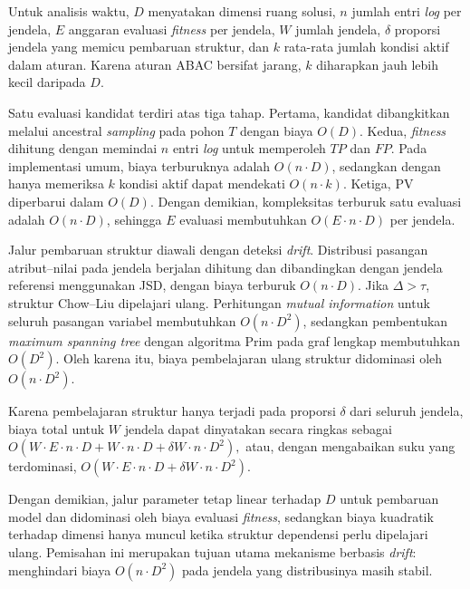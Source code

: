Untuk analisis waktu, $D$ menyatakan dimensi ruang solusi, $n$\label{first:symbolnn} jumlah entri \textit{log} per jendela, $E$ anggaran evaluasi \textit{fitness} per jendela, $W$ jumlah jendela, $\delta$\label{first:symbol-deltagede} proporsi jendela yang memicu pembaruan struktur, dan $k$ rata-rata jumlah kondisi aktif dalam aturan. 
Karena aturan ABAC bersifat jarang, $k$ diharapkan jauh lebih kecil daripada $D$.

Satu evaluasi kandidat terdiri atas tiga tahap. 
Pertama, kandidat dibangkitkan melalui ancestral \textit{sampling} pada pohon $T$ dengan biaya $O(D)$. 
Kedua, \textit{fitness} dihitung dengan memindai $n$ entri \textit{log} untuk memperoleh $TP$ dan $FP$. 
Pada implementasi umum, biaya terburuknya adalah $O(n \cdot D)$, sedangkan dengan hanya memeriksa $k$ kondisi aktif dapat mendekati $O(n \cdot k)$. 
Ketiga, PV diperbarui dalam $O(D)$. 
Dengan demikian, kompleksitas terburuk satu evaluasi adalah $O(n \cdot D)$, sehingga $E$ evaluasi membutuhkan
$
O(E \cdot n \cdot D)
$
per jendela.

Jalur pembaruan struktur diawali dengan deteksi \textit{drift}. 
Distribusi pasangan atribut–nilai pada jendela berjalan dihitung dan dibandingkan dengan jendela referensi menggunakan JSD, dengan biaya terburuk $O(n \cdot D)$. 
Jika $\Delta>\tau$, struktur Chow–Liu dipelajari ulang. 
Perhitungan \textit{mutual information} untuk seluruh pasangan variabel membutuhkan $O(n \cdot D^2)$, sedangkan pembentukan \textit{maximum spanning tree} dengan algoritma Prim pada graf lengkap membutuhkan $O(D^2)$. 
Oleh karena itu, biaya pembelajaran ulang struktur didominasi oleh
$
O(n \cdot D^2).
$

Karena pembelajaran struktur hanya terjadi pada proporsi $\delta$ dari seluruh jendela, biaya total untuk $W$ jendela dapat dinyatakan secara ringkas sebagai
$
O\left(W \cdot E \cdot n \cdot D + W \cdot n \cdot D + \delta W \cdot n \cdot D^2\right),
$
atau, dengan mengabaikan suku yang terdominasi,
$
O\left(W \cdot E \cdot n \cdot D + \delta W \cdot n \cdot D^2\right).
$

Dengan demikian, jalur parameter tetap linear terhadap $D$ untuk pembaruan model dan didominasi oleh biaya evaluasi \textit{fitness}, sedangkan biaya kuadratik terhadap dimensi hanya muncul ketika struktur dependensi perlu dipelajari ulang. 
Pemisahan ini merupakan tujuan utama mekanisme berbasis \textit{drift}: menghindari biaya $O(n \cdot D^2)$ pada jendela yang distribusinya masih stabil.

